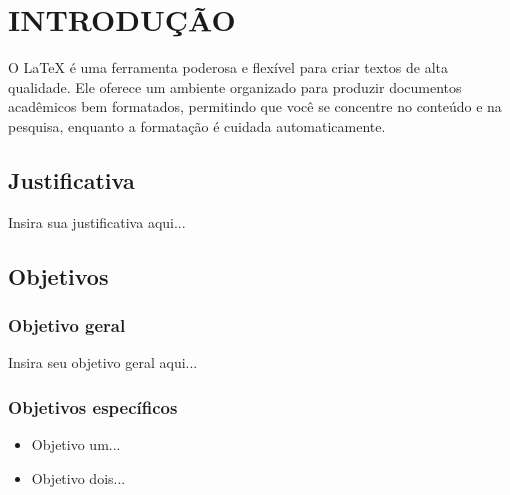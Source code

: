 
\chapter{INTRODUÇÃO}
\label{chap:introducao}

O \LaTeX{} é uma ferramenta poderosa e flexível para criar textos de alta qualidade. Ele oferece um ambiente organizado para produzir documentos acadêmicos bem formatados, permitindo que você se concentre no conteúdo e na pesquisa, enquanto a formatação é cuidada automaticamente.

\section{Justificativa}
\label{sec:justificativa}

Insira sua justificativa aqui...

\section{Objetivos}
\label{sec:objetivos}

\subsection{Objetivo geral}
\label{subsec:objetivoGeral}

Insira seu objetivo geral aqui...

\subsection{Objetivos específicos}
\label{subsec:objetivosEspecificos}

\begin{itemize}
    \item Objetivo um...
    \item Objetivo dois...
\end{itemize}
